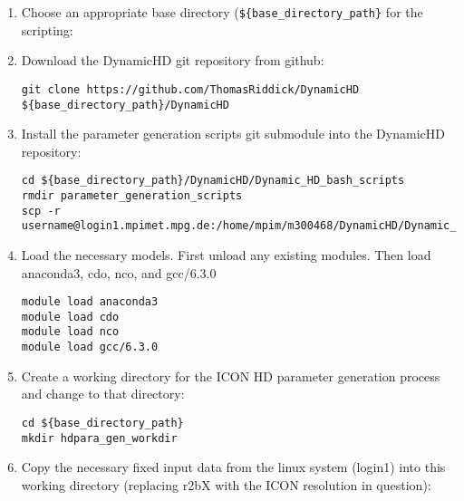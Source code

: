 \documentclass{article}
\begin{document}
\begin{enumerate}
\item Choose an appropriate base directory (\lstinline[style=bash_input]|${base_directory_path}| for the scripting:

\item Download the DynamicHD git repository from github:
\begin{lstlisting}[style=bash_input,breaklines=true]
git clone https://github.com/ThomasRiddick/DynamicHD ${base_directory_path}/DynamicHD
\end{lstlisting}
\item Install the parameter generation scripts git submodule into the DynamicHD repository:
\begin{lstlisting}[style=bash_input,breaklines=true] 
cd ${base_directory_path}/DynamicHD/Dynamic_HD_bash_scripts
rmdir parameter_generation_scripts
scp -r  username@login1.mpimet.mpg.de:/home/mpim/m300468/DynamicHD/Dynamic_HD_bash_scripts/parameter_generation_scripts
\end{lstlisting}

\item Load the necessary models. First unload any existing modules. Then load anaconda3, cdo, nco, and gcc/6.3.0

\begin{lstlisting}[style=bash_input,breaklines=true] 
module load anaconda3
module load cdo
module load nco
module load gcc/6.3.0
\end{lstlisting}


\item Create a working directory for the ICON HD parameter generation process and change to that directory:
\begin{lstlisting}[style=bash_input,breaklines=true] 
cd ${base_directory_path}
mkdir hdpara_gen_workdir
\end{lstlisting}

\item Copy the necessary fixed input data from the linux system (login1) into this working directory (replacing r2bX with the ICON resolution in question):


\end{enumerate}
\end{document}
